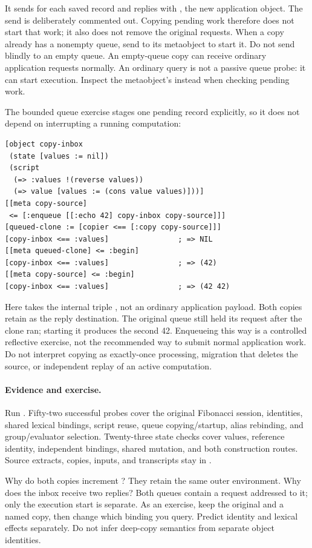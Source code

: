 
It sends  for each saved record and replies with
, the new application object. The 
send is deliberately commented out. Copying pending work therefore does
not start that work; it also does not remove the original requests.
When a copy already has a nonempty queue, send  to its
metaobject to start it. Do not send  blindly to an empty queue.
An empty-queue copy can receive ordinary application requests normally.
An ordinary query is not a passive queue probe: it can start execution.
Inspect the metaobject's  instead when checking pending work.

The bounded queue exercise stages one pending record explicitly, so it
does not depend on interrupting a running computation:

\begin{codeblock}
\begin{lstlisting}
[object copy-inbox
 (state [values := nil])
 (script
  (=> :values !(reverse values))
  (=> value [values := (cons value values)]))]
[[meta copy-source]
 <= [:enqueue [[:echo 42] copy-inbox copy-source]]]
[queued-clone := [copier <== [:copy copy-source]]]
[copy-inbox <== :values]                ; => NIL
[[meta queued-clone] <= :begin]
[copy-inbox <== :values]                ; => (42)
[[meta copy-source] <= :begin]
[copy-inbox <== :values]                ; => (42 42)
\end{lstlisting}
\end{codeblock}

Here \code{[:enqueue ...]} takes the internal triple
, not an ordinary application payload.
Both copies retain  as the reply destination. The
original queue still held its request after the clone ran; starting it
produces the second 42. Enqueueing this way is a controlled reflective
exercise, not the recommended way to submit normal application work.
Do not interpret copying as exactly-once processing, migration that
deletes the source, or independent replay of an active computation.

\paragraph{Evidence and exercise.}
Run . Fifty-two successful probes
cover the original Fibonacci session, identities, shared lexical bindings,
script reuse, queue copying/startup, alias rebinding, and group/evaluator
selection. Twenty-three state checks cover values, reference identity,
independent bindings, shared mutation, and both construction routes. Source extracts,
copies, inputs, and transcripts stay in .

Why do both copies increment ? They retain the same outer
environment. Why does the inbox receive two replies? Both queues contain
a request addressed to it; only the execution start is separate. As an
exercise, keep the original and a named copy, then change which binding
you query. Predict identity and lexical effects separately. Do not infer
deep-copy semantics from separate object identities.
